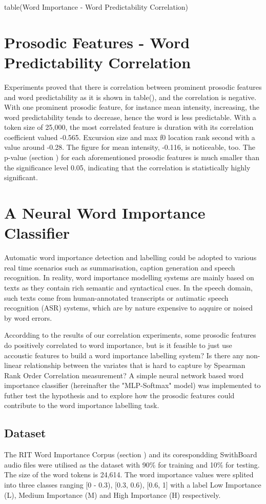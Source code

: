 table(Word Importance - Word Predictability Correlation)

\section{Prosodic Features - Word Predictability Correlation}
Experiments proved that there is correlation between prominent prosodic features and word predictability as it is shown in table(), and the correlation is negative. With one prominent prosodic feature, for instance mean intensity, increasing, the word predictability tends to decrease, hence the word is less predictable. With a token size of 25,000, the most correlated feature is duration with its correlation coefficient valued -0.565. Excursion size and max f0 location rank second with a value around -0.28. The figure for mean intensity, -0.116, is noticeable, too. The p-value (section ) for each aforementioned prosodic features is much smaller than the significance level 0.05, indicating that the correlation is statistically highly significant.

\section{A Neural Word Importance Classifier}
Automatic word importance detection and labelling could be adopted to various real time scenarios such as summarisation, caption generation and speech recognition. In reality, word importance modelling systems are mainly based on texts as they contain rich semantic and syntactical cues. In the speech domain, such texts come from human-annotated transcripts or autimatic speech recognition (ASR) systems, which are by nature expensive to aqquire or noised by word errors.

 Accordding to the results of our correlation experiments, some prosodic features do positively correlated to word importance, but is it feasible to just use accoustic features to build a word importance labelling system? Is there any non-linear relationship between the variates that is hard to capture by Spearman Rank Order Correlation measurement?  A simple neural network based word importance classifier (hereinafter the "MLP-Softmax" model) was implemented to futher test the hypothesis and to explore how the prosodic features could contribute to the word importance labelling task.
 
 \subsection{Dataset}
 The RIT Word Importance Corpus (section   ) and its corespondding SwithBoard audio files were utilised as the dataset with 90\% for training and 10\% for testing. The size of the word tokens is 24,614. The word importance values were splited into three classes ranging [0 - 0.3), [0.3, 0.6), [0.6, 1] with a label Low Importance (L), Medium Importance (M) and High Importance (H) respectively. 
 
